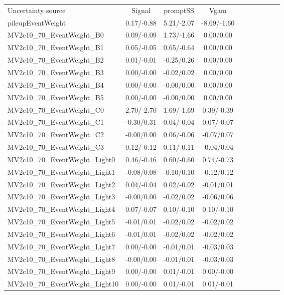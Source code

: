\begin{table}[h]
\scriptsize
\begin{center}
\begin{tabular}{l|ccccccccc}
\hline
\hline
Uncertainty source &Signal &promptSS &Vgam \\
pileupEventWeight &0.17/-0.88 &5.21/-2.07 &-8.69/-1.60 \\
MV2c10\_70\_EventWeight\_B0 &0.09/-0.09 &1.73/-1.66 &0.00/0.00 \\
MV2c10\_70\_EventWeight\_B1 &0.05/-0.05 &0.65/-0.64 &0.00/0.00 \\
MV2c10\_70\_EventWeight\_B2 &0.01/-0.01 &-0.25/0.26 &0.00/0.00 \\
MV2c10\_70\_EventWeight\_B3 &0.00/-0.00 &-0.02/0.02 &0.00/0.00 \\
MV2c10\_70\_EventWeight\_B4 &0.00/-0.00 &-0.00/0.00 &0.00/0.00 \\
MV2c10\_70\_EventWeight\_B5 &0.00/-0.00 &-0.00/0.00 &0.00/0.00 \\
MV2c10\_70\_EventWeight\_C0 &2.70/-2.70 &1.69/-1.69 &0.39/-0.39 \\
MV2c10\_70\_EventWeight\_C1 &-0.30/0.31 &0.04/-0.04 &0.07/-0.07 \\
MV2c10\_70\_EventWeight\_C2 &-0.00/0.00 &0.06/-0.06 &-0.07/0.07 \\
MV2c10\_70\_EventWeight\_C3 &0.12/-0.12 &0.11/-0.11 &-0.04/0.04 \\
MV2c10\_70\_EventWeight\_Light0 &0.46/-0.46 &0.60/-0.60 &0.74/-0.73 \\
MV2c10\_70\_EventWeight\_Light1 &-0.08/0.08 &-0.10/0.10 &-0.12/0.12 \\
MV2c10\_70\_EventWeight\_Light2 &0.04/-0.04 &0.02/-0.02 &-0.01/0.01 \\
MV2c10\_70\_EventWeight\_Light3 &-0.00/0.00 &-0.02/0.02 &-0.06/0.06 \\
MV2c10\_70\_EventWeight\_Light4 &0.07/-0.07 &0.10/-0.10 &0.10/-0.10 \\
MV2c10\_70\_EventWeight\_Light5 &-0.01/0.01 &-0.02/0.02 &-0.02/0.02 \\
MV2c10\_70\_EventWeight\_Light6 &-0.01/0.01 &-0.02/0.02 &-0.02/0.02 \\
MV2c10\_70\_EventWeight\_Light7 &0.00/-0.00 &-0.01/0.01 &-0.03/0.03 \\
MV2c10\_70\_EventWeight\_Light8 &-0.00/0.00 &-0.01/0.01 &-0.03/0.03 \\
MV2c10\_70\_EventWeight\_Light9 &0.00/-0.00 &0.01/-0.01 &0.00/-0.00 \\
MV2c10\_70\_EventWeight\_Light10 &0.00/-0.00 &0.01/-0.01 &0.01/-0.01 \\

\end{tabular}
\end{center}
\end{table}
